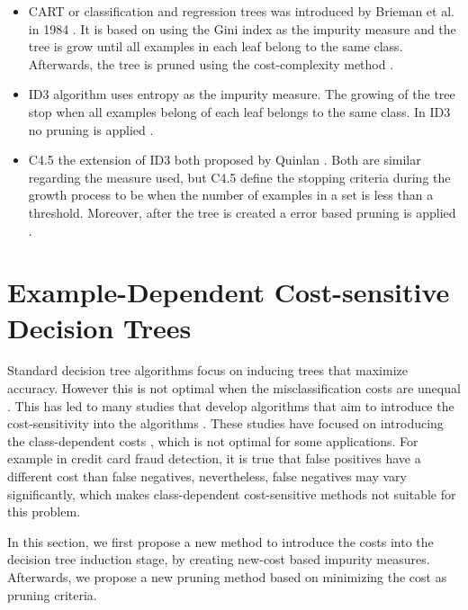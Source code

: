 \begin{itemize}
 \item 
  CART or classification and regression trees was introduced by Brieman et al. in 1984 
\citep{Breiman1984a}. It is based on using the Gini index as the impurity measure and the tree is 
grow until all examples in  each leaf belong to the same class. Afterwards, the tree is pruned using 
the cost-complexity  method \citep{Rokach2010,Marslan2009}.
  
\item ID3
  algorithm uses entropy as the impurity measure. The growing of the tree stop when all 
examples belong  of each leaf belongs to the same class. In ID3 no pruning is applied 
\citep{Quinlan1992}.
  
\item C4.5
  the extension of ID3 both proposed by Quinlan \citep{Quinlan1992}.  Both are similar 
regarding the measure used, but C4.5 define the stopping criteria during the growth process
  to be when the number of examples in a set is less than a threshold. Moreover, after the tree is 
created  a error based pruning is applied \citep{Rokach2010}.
\end{itemize} 


\section{Example-Dependent Cost-sensitive Decision Trees}
\label{sec:7:csdt}

Standard decision tree algorithms focus on inducing trees that maximize accuracy. However this is 
	not optimal when the misclassification costs are unequal \citep{Elkan2001}. This has led to many 
	studies that develop algorithms that aim to introduce the cost-sensitivity into the algorithms 
	\citep{Lomax2013}. These studies have focused on introducing the class-dependent costs  
	\citep{Draper1994,Ting2002,Ling2004,Li2005,Kretowski2006,Vadera2010}, which is not optimal for 
	some applications. For example in credit card fraud detection, it is true that false positives 
	have a different cost than false negatives, nevertheless, false negatives may vary significantly, 
	which makes class-dependent cost-sensitive methods not suitable for this problem.
      
  In this section, we first propose a new method to introduce the costs into the decision tree 
	induction stage, by creating new-cost based impurity measures. Afterwards, we propose a new 
	pruning method based on minimizing the cost as pruning criteria.

